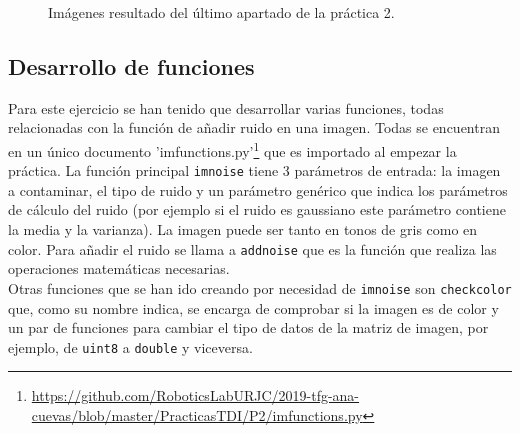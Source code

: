\begin{figure}[!tbp]
  \centering
  \hfill
  \caption{Imágenes resultado del último apartado de la práctica 2.}
  \label{p2final}
\end{figure}


\subsection{Desarrollo de funciones}

Para este ejercicio se han tenido que desarrollar varias funciones, todas relacionadas con la función de añadir ruido en una imagen. Todas se encuentran en un único documento 'imfunctions.py'\footnote{\url{https://github.com/RoboticsLabURJC/2019-tfg-ana-cuevas/blob/master/PracticasTDI/P2/imfunctions.py}} que es importado al empezar la práctica. La función principal \texttt{imnoise} tiene 3 parámetros de entrada: la imagen a contaminar, el tipo de ruido y un parámetro genérico que indica los parámetros de cálculo del ruido (por ejemplo si el ruido es gaussiano este parámetro contiene la media y la varianza). La imagen puede ser tanto en tonos de gris como en color. Para añadir el ruido se llama a \texttt{addnoise} que es la función que realiza las operaciones matemáticas necesarias.\\

Otras funciones que se han ido creando por necesidad de \texttt{imnoise} son \texttt{checkcolor} que, como su nombre indica, se encarga de comprobar si la imagen es de color y un par de funciones para cambiar el tipo de datos de la matriz de imagen, por ejemplo, de \texttt{uint8} a \texttt{double} y viceversa.

